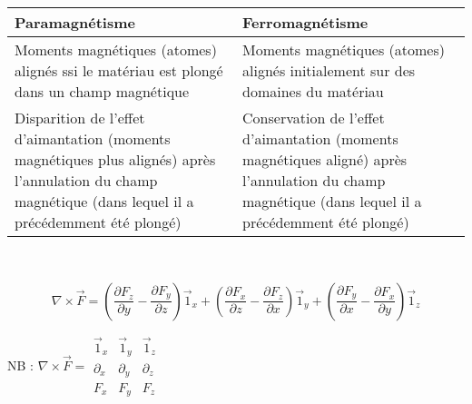 \documentclass[british,french,11pt, a4paper, openany]{book}
\begin{document}
		\\\\
		\renewcommand{\arraystretch}{1.8}
		\begin{tabular}{|p{7.55cm}|p{7.55cm}|}
			\hline
			Paramagnétisme                                                                                                                                                     & Ferromagnétisme                                                                                                                                               \\
			\hline
			Moments magnétiques (atomes) alignés  ssi le matériau est plongé dans un champ magnétique                                                                      & Moments magnétiques (atomes) alignés initialement sur des domaines du matériau                                                                              \\
			\hline
			Disparition de l'effet d'aimantation (moments magnétiques plus alignés) après l'annulation du champ magnétique (dans lequel il a précédemment été  plongé) & Conservation de l'effet d'aimantation (moments magnétiques aligné) après l'annulation du champ magnétique (dans lequel il a précédemment été  plongé) \\
			\hline
		\end{tabular}\\
		
		
		$$ \nabla \times \vec F = \left(\frac{\partial F_z}{\partial y} - \frac{\partial F_y}{\partial z}\right)\vec 1_x + \left(\frac{\partial F_x}{\partial z} - \frac{\partial F_z}{\partial x}\right)\vec 1_y + \left(\frac{\partial F_y}{\partial x} - \frac{\partial F_x}{\partial y}\right)\vec 1_z $$
		
		NB : $ \nabla \times \vec F = \begin{array}{|ccc|}
		\vec 1_x & \vec 1_y & \vec  1_z \\ 
		\partial_x & \partial_y & \partial_z \\ 
		F_x & F_y & F_z
		\end{array} $
		
		
\end{document}
